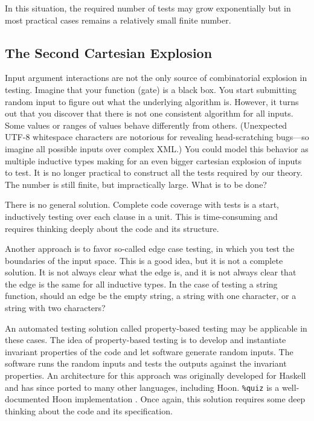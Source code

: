 \documentclass[twoside]{article}
\begin{document}
In this situation, the required number of tests may grow exponentially but in most practical cases remains a relatively small finite number.

\subsection{The Second Cartesian Explosion}

Input argument interactions are not the only source of combinatorial explosion in testing. Imagine that your function (gate) is a black box. You start submitting random input to figure out what the underlying algorithm is. However, it turns out that you discover that there is not one consistent algorithm for all inputs. Some values or ranges of values behave differently from others. (Unexpected UTF-8 whitespace characters are notorious for revealing head-scratching bugs—so imagine all possible inputs over complex XML.) You could model this behavior as multiple inductive types making for an even bigger cartesian explosion of inputs to test. It is no longer practical to construct all the tests required by our theory. The number is still finite, but impractically large. What is to be done?

There is no general solution. Complete code coverage with tests is a start, inductively testing over each clause in a unit. This is time-consuming and requires thinking deeply about the code and its structure.

Another approach is to favor so-called edge case testing, in which you test the boundaries of the input space. This is a good idea, but it is not a complete solution. It is not always clear what the edge is, and it is not always clear that the edge is the same for all inductive types. In the case of testing a string function, should an edge be the empty string, a string with one character, or a string with two characters? 

An automated testing solution called property-based testing may be applicable in these cases. The idea of property-based testing is to develop and instantiate invariant properties of the code and let software generate random inputs. The software runs the random inputs and tests the outputs against the invariant properties. An architecture for this approach was originally developed for Haskell and has since ported to many other languages, including Hoon.  \texttt{\%quiz} is a well-documented Hoon implementation \citep{Hjort2023}.  Once again, this solution requires some deep thinking about the code and its specification.
\end{document}
